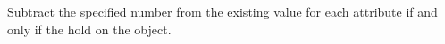 Subtract the specified number from the existing value for each attribute if and
only if the  hold on the object.



